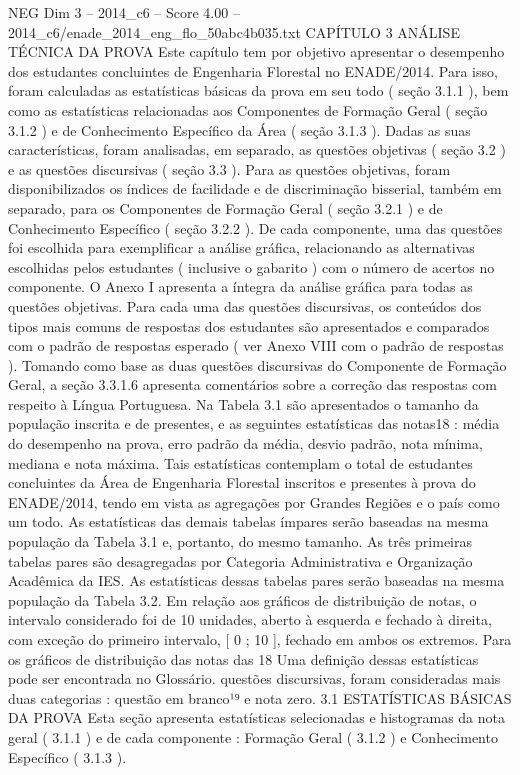 \begin{textsample}{NEG Dim 3 – 2014\_c6 – Score 4.00 – 2014\_c6/enade\_2014\_eng\_flo\_50abc4b035.txt}  \label{ex:f3_neg_246}
CAPÍTULO 3 ANÁLISE TÉCNICA DA PROVA Este capítulo tem por objetivo apresentar o desempenho dos estudantes concluintes de Engenharia Florestal no ENADE/2014.
Para isso, foram calculadas as estatísticas básicas da prova em seu todo ( seção 3.1.1 ), bem como as estatísticas relacionadas aos Componentes de Formação Geral ( seção 3.1.2 ) e de Conhecimento Específico da Área ( seção 3.1.3 ).
Dadas as suas características, foram analisadas, em separado, as questões objetivas ( seção 3.2 ) e as questões discursivas ( seção 3.3 ).
Para as questões objetivas, foram disponibilizados os índices de facilidade e de discriminação bisserial, também em separado, para os Componentes de Formação Geral ( seção 3.2.1 ) e de Conhecimento Específico ( seção 3.2.2 ).
De cada componente, uma das questões foi escolhida para exemplificar a análise gráfica, relacionando as alternativas escolhidas pelos estudantes ( inclusive o gabarito ) com o número de acertos no componente.
O Anexo I apresenta a íntegra da análise gráfica para todas as questões objetivas.
Para cada uma das questões discursivas, os conteúdos dos tipos mais comuns de respostas dos estudantes são apresentados e comparados com o padrão de respostas esperado ( ver Anexo VIII com o padrão de respostas ).
Tomando como base as duas questões discursivas do Componente de Formação Geral, a seção 3.3.1.6 apresenta comentários sobre a correção das respostas com respeito à Língua Portuguesa.
Na Tabela 3.1 são apresentados o tamanho da população inscrita e de presentes, e as seguintes estatísticas das notas18 : média do desempenho na prova, erro padrão da média, desvio padrão, nota mínima, mediana e nota máxima.
Tais estatísticas contemplam o total de estudantes concluintes da Área de Engenharia Florestal inscritos e presentes à prova do ENADE/2014, tendo em vista as agregações por Grandes Regiões e o país como um todo.
As estatísticas das demais tabelas ímpares serão baseadas na mesma população da Tabela 3.1 e, portanto, do mesmo tamanho.
As três primeiras tabelas pares são desagregadas por Categoria Administrativa e Organização Acadêmica da IES.
As estatísticas dessas tabelas pares serão baseadas na mesma população da Tabela 3.2.
Em relação aos gráficos de distribuição de notas, o intervalo considerado foi de 10 unidades, aberto à esquerda e fechado à direita, com exceção do primeiro intervalo, [ 0 ; 10 ], fechado em ambos os extremos.
Para os gráficos de distribuição das notas das 18 Uma definição dessas estatísticas pode ser encontrada no Glossário. questões discursivas, foram consideradas mais duas categorias : questão em branco¹⁹ e nota zero. 3.1 ESTATÍSTICAS BÁSICAS DA PROVA Esta seção apresenta estatísticas selecionadas e histogramas da nota geral ( 3.1.1 ) e de cada componente : Formação Geral ( 3.1.2 ) e Conhecimento Específico ( 3.1.3 ).

\end{textsample}
